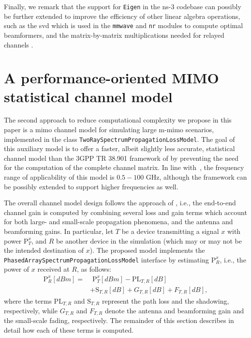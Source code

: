 Finally, we remark that the support for \texttt{Eigen} in the ns-3 codebase can possibly be further extended to improve the efficiency of other linear algebra operations, such as the \gls{svd} which is used in the \texttt{mmwave} and \texttt{nr} modules to compute optimal beamformers, and the matrix-by-matrix multiplications needed for relayed channels \cite{9810370}.

\section{A performance-oriented MIMO statistical channel model}
\label{sec:opt_design}

The second approach to reduce computational complexity we propose in this paper is a 
\gls{mimo} channel model for simulating large \gls{m-mimo} scenarios, implemented in the class \texttt{Two\-Ray\-Spectrum\-Propagation\-Loss\-Model}. The goal of this auxiliary model is to offer a faster, albeit slightly less accurate, statistical channel model than the 3GPP TR 38.901 framework of \cite{tommaso:20} by preventing the need for the computation of the complete channel matrix. In line with~\cite{TR38901}, the frequency range of applicability of this model is $0.5 - 100$ GHz, although the framework can be possibly extended to support higher frequencies as well.

The overall channel model design follows the approach of \cite{8445856}, i.e., the end-to-end channel gain is computed by combining several loss and gain terms which account for both large- and small-scale propagation phenomena, and the antenna and beamforming gains.
In particular, let $T$ be a device transmitting a signal $x$ with power $\mathrm{P}_T^x$, and $R$ be another device in the simulation (which may or may not be the intended destination of
$x$). 
The proposed model implements the \texttt{Phased\-Array\-Spectrum\-Propagation\-Loss\-Model} interface by estimating $\mathrm{P}_R^x$, i.e., the power of $x$ received at $R$, as follows:
\begin{align}
\mathrm{P}_R^x[d B m] =& \,\, \mathrm{P}_T^x[d B m] - \mathrm{PL}_{T, R}[d B] \\
        &+ \mathrm{S}_{T, R}[d B] + G_{T, R}[d B] + F_{T, R}[d B], \nonumber
\end{align}
where the terms $\mathrm{PL}_{T, R}$ and $\mathrm{S}_{T, R}$ represent the path loss and the shadowing, respectively, while $G_{T, R}$ and $F_{T, R}$ denote the antenna and beamforming gain and the small-scale fading, respectively. The remainder of this section describes in detail how each of these terms is computed.

